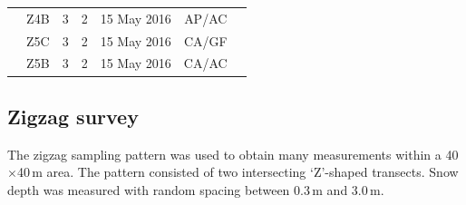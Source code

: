 \documentclass{sfuthesis}
\begin{document}
\begin{table}
\begin{tabular}{ccccccl}
                      & Z4B               & 3                                                               & 2                                                                             & 15 May 2016   & AP/AC              &                                                                              \\
                      & Z5C               & 3                                                               & 2                                                                             & 15 May 2016   & CA/GF              &                                                                              \\
                      & Z5B               & 3                                                               & 2                                                                             & 15 May 2016   & CA/AC              &                                                                             
\end{tabular}
\end{table}



\subsection{Zigzag survey}
\label{sec:zigzagmethods}

The zigzag sampling pattern was used to obtain many measurements within a 40$\times$40\,m area.  The pattern consisted of two intersecting `Z'-shaped transects. Snow depth was measured with random spacing between 0.3\,m and 3.0\,m. 
\end{document}
